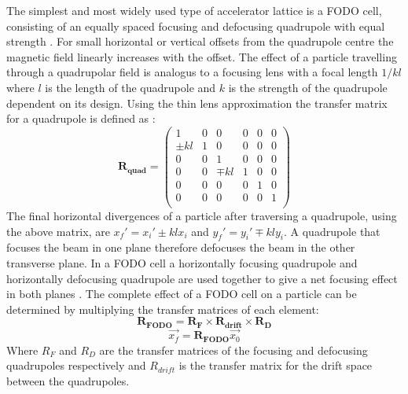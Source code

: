The simplest and most widely used type of accelerator lattice is a FODO cell, consisting of an equally spaced focusing and defocusing quadrupole with equal strength \cite{wilson}. For small horizontal or vertical offsets from the quadrupole centre the magnetic field linearly increases with the offset. The effect of a particle travelling through a quadrupolar field is analogus to a focusing lens with a focal length \(1/kl\) where \(l\) is the length of the quadrupole and \(k\) is the strength of the quadrupole dependent on its design. Using the thin lens approximation the transfer matrix for a quadrupole is defined as \cite{wiedemann}:
\begin{equation}
\mathbf{R_{quad}}
=
\left( \begin{array}{cccccc} 
1 & 0 & 0 & 0 & 0 & 0\\
\pm kl & 1 & 0 & 0 & 0 & 0 \\
0 & 0 & 1 & 0 & 0 & 0 \\
0 & 0 & \mp kl & 1 & 0 & 0 \\
0 & 0 & 0 & 0 & 1 & 0 \\
0 & 0 & 0 & 0 & 0 & 1 \\
\end{array} \right)
\label{e:quadTransfer}
\end{equation}
The final horizontal divergences of a particle after traversing a quadrupole, using the above matrix, are \(x_f' = x_i' \pm klx_i\) and \(y_f' = y_i' \mp kly_i\). A quadrupole that focuses the beam in one plane therefore defocuses the beam in the other transverse plane. In a FODO cell a horizontally focusing quadrupole and horizontally defocusing quadrupole are used together to give a net focusing effect in both planes \cite{wiedemann}. The complete effect of a FODO cell on a particle can be determined by multiplying the transfer matrices of each element:
\begin{equation}
\mathbf{R_{FODO}} = \mathbf{R_{F} \times R_{drift} \times R_{D}}
\end{equation}
\begin{equation}
\vec{x_f} = \mathbf{R_{FODO}}\vec{x_0}
\end{equation}
Where \(R_{F}\) and \(R_{D}\) are the transfer matrices of the focusing and defocusing quadrupoles respectively and \(R_{drift}\) is the transfer matrix for the drift space between the quadrupoles. 

